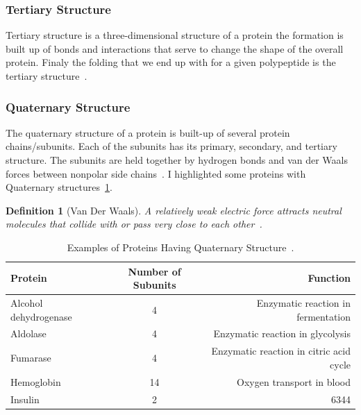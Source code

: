 \documentclass{report}
\newtheorem{definition}{Definition}[section]
\begin{document}
\subsubsection{Tertiary Structure}

Tertiary structure is a three-dimensional structure of a protein the formation is built up of bonds and interactions that serve to change the shape of the overall protein. Finaly the folding that we end up with for a given polypeptide is the tertiary structure~\cite{godbey_chapter_2022}.

\subsubsection{Quaternary Structure}

The quaternary structure of a protein is built-up of several protein chains/subunits. Each of the subunits has its primary, secondary, and tertiary structure. The subunits are held together by hydrogen bonds and van der Waals forces between nonpolar side chains~\cite{ouellette_14_2015}. I highlighted some proteins with Quaternary structures~\ref{Quanternanry Protiens}.

\begin{definition}[Van Der Waals]
    A relatively weak electric force attracts neutral molecules that collide with or pass very close to each other~\cite{noauthor_210_2018}.
\end{definition}

\begin{table}[h!]
    \begin{center}
    \label{tab:Quanternanry Protiens}
        \begin{tabular}{l|c|r}
            \hline
            Protein & Number of Subunits & Function\\
            \hline
            Alcohol dehydrogenase & 4 & Enzymatic reaction in fermentation\\ 
            \hline
            Aldolase & 4 & Enzymatic reaction in glycolysis\\
            \hline
            Fumarase & 4 & Enzymatic reaction in citric acid cycle \\
            \hline
            Hemoglobin & 14 & Oxygen transport in blood\\
            \hline
            Insulin & 2 & 6344\\
            \hline
        \end{tabular}
        \caption{\label{Quanternanry Protiens}Examples of Proteins Having Quaternary Structure~\cite{ouellette_14_2015}.}
    \end{center}
\end{table}
\end{document}
